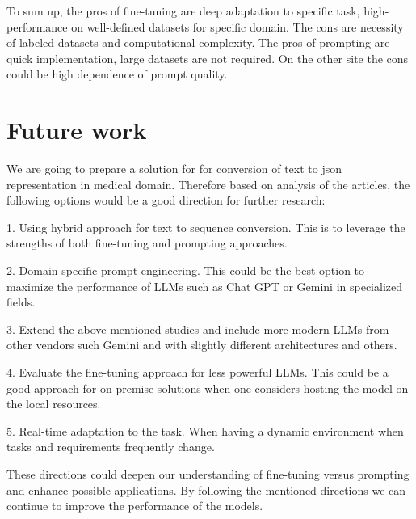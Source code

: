 \documentclass[11pt]{article}
\begin{document}
To sum up, the pros of fine-tuning are deep adaptation to specific task, high-performance on well-defined datasets for specific domain. The cons are necessity of labeled datasets and computational complexity. The pros of prompting are quick implementation, large datasets are not required. On the other site the cons could be high dependence of prompt quality.


\section{Future work}

We are going to prepare a solution for for conversion of text to json representation in medical domain. Therefore based on analysis of the articles, the following options would be a good direction for further research:

1. Using hybrid approach for text to sequence conversion. This is to leverage the strengths of both fine-tuning and prompting approaches.

2. Domain specific prompt engineering. This could be the best option to maximize the performance of LLMs such as Chat GPT or Gemini in specialized fields.

3. Extend the above-mentioned studies and include more modern LLMs from other vendors such Gemini and with slightly different architectures and others. 

4. Evaluate the fine-tuning approach for less powerful LLMs. This could be a good approach for on-premise solutions when one considers hosting the model on the local resources.

5. Real-time adaptation to the task. When having a dynamic environment when tasks and requirements frequently change.

These directions could deepen our understanding of fine-tuning versus prompting and enhance possible applications. By following the mentioned directions we can continue to improve the performance of the models.
\end{document}
